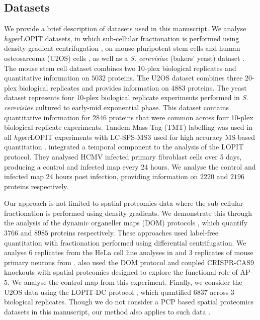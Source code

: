 \documentclass[12pt,english]{article}
\begin{document}
\subsection{Datasets}
We provide a brief description of datasets used in this manuscript. We analyse \textit{hyper}LOPIT datasets, in which sub-cellular fractionation is performed using density-gradient centrifugation \citep{Dunkley:2004, Dunkley:2006, Mulvey:2017}, on mouse pluripotent stem cells \citep{hyper} and human osteosarcoma (U2OS) cells \citep{Thul:2017, DC:2018}, as well as a \textit{S. cerevisiae} (bakers' yeast) dataset \citep{Nightingale::2019}. The mouse stem cell dataset combines two 10-plex biological replicates and quantitative information on $5032$ proteins. The U2OS dataset combines three 20-plex biological replicates and provides information on $4883$ proteins. The yeast dataset represents four 10-plex biological replicate experiments performed in \textit{S. cerevisiae} cultured to early-mid exponential phase. This dataset contains quantitative information for $2846$ proteins that were common across four 10-plex biological replicate experiments. Tandem Mass Tag (TMT) \citep{Thompson:2003} labelling was used in all \textit{hyper}LOPIT experiments with LC-SPS-MS3 used for high accuracy MS-based quantitation \citep{Ting:2011, Mcalister::2014}. \cite{Jean_Beltran:2016} integrated a temporal component to the analysis of the LOPIT protocol. They analysed HCMV infected primary fibroblast cells over 5 days, producing a control and infected map every 24 hours. We analyse the control and infected map 24 hours post infection, providing information on $2220$ and $2196$ proteins respectively. 

Our approach is not limited to spatial proteomics data where the sub-cellular fractionation is performed using density gradients. We demonstrate this through the analysis of the dynamic organeller maps (DOM) protocols \citep{Itzhak:2016, Itzhak::2017}, which quantify $3766$ and $8985$ proteins respectively. These approaches used label-free quantitation with fractionation performed using differential centrifugation. We analyse $6$ replicates from the HeLa cell line analyses in \cite{Itzhak:2016} and $3$ replicates of mouse primary neurons from \cite{Itzhak::2017}. \cite{Hirst:2018} also used the DOM protocol and coupled CRISPR-CAS9 knockouts with spatial proteomics designed to explore the functional role of AP-5. We analyse the control map from this experiment. Finally, we consider the U2OS data using the LOPIT-DC protocol \citep{DC:2018}, which quantified $6837$ across $3$ biological replicates. Though we do not consider a PCP based spatial proteomics datasets in this manuscript, our method also applies to such data \citep{Foster:2006, kristensen:2012, kristensen:2014}.
\end{document}
